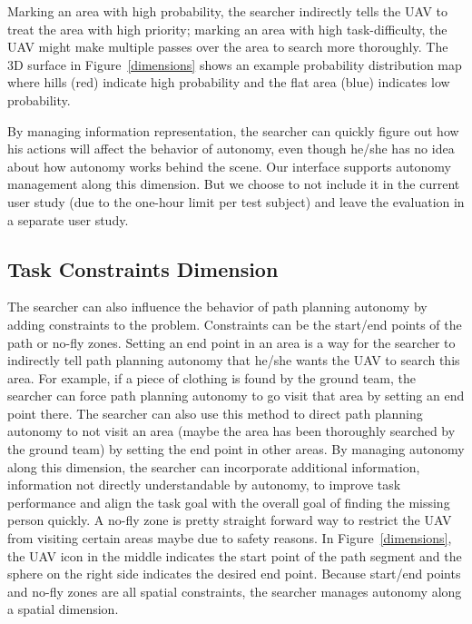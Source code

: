 \documentclass[lettersize, apacite, twoside, HRI]{apa_HRI}
\begin{document}
Marking an area with high probability, the searcher indirectly tells the UAV to treat the area with high priority; marking an area with high task-difficulty, the UAV might make multiple passes over the area to search more thoroughly. The 3D surface in Figure~\ref{dimensions} shows an example probability distribution map where hills (red) indicate high probability and the flat area (blue) indicates low probability.

By managing information representation, the searcher can quickly figure out how his actions will affect the behavior of autonomy, even though he/she has no idea about how autonomy works behind the scene. Our interface supports autonomy management along this dimension. But we choose to not include it in the current user study (due to the one-hour limit per test subject) and leave the evaluation in a separate user study.

\subsection{Task Constraints Dimension}

The searcher can also influence the behavior of path planning autonomy by adding constraints to the problem. Constraints can be the start/end points of the path or no-fly zones. Setting an end point in an area is a way for the searcher to indirectly tell path planning autonomy that he/she wants the UAV to search this area. For example, if a piece of clothing is found by the ground team, the searcher can force path planning autonomy to go visit that area by setting an end point there. The searcher can also use this method to direct path planning autonomy to not visit an area (maybe the area has been thoroughly searched by the ground team) by setting the end point in other areas. By managing autonomy along this dimension, the searcher can incorporate additional information, information not directly understandable by autonomy, to improve task performance and align the task goal with the overall goal of finding the missing person quickly. A no-fly zone is pretty straight forward way to restrict the UAV from visiting certain areas maybe due to safety reasons. In Figure~\ref{dimensions}, the UAV icon in the middle indicates the start point of the path segment and the sphere on the right side indicates the desired end point. Because start/end points and no-fly zones are all spatial constraints, the searcher manages autonomy along a spatial dimension.
\end{document}
